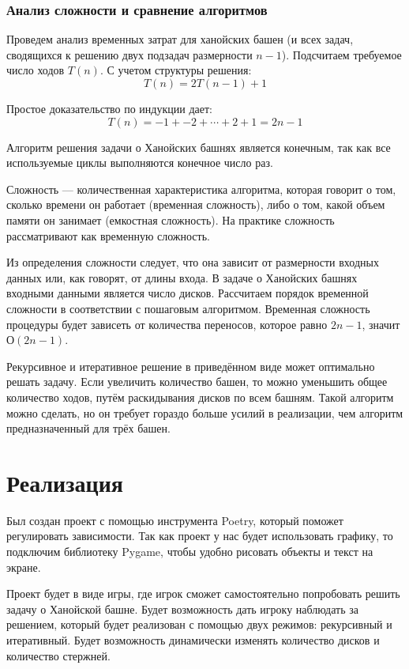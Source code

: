 \subsubsection{Анализ сложности и сравнение алгоритмов}

Проведем анализ временных затрат для ханойских башен (и всех задач, сводящихся
к решению двух подзадач размерности $n-1$). Подсчитаем требуемое число ходов
$T(n)$. С учетом структуры решения:
\[T(n) = 2T(n-1) + 1\]

Простое доказательство по индукции дает:
\[T(n) = -1 + -2 + \cdots + 2 +1 = 2n - 1\]

Алгоритм решения задачи о Ханойских башнях является конечным, так как все
используемые циклы выполняются конечное число раз.

Сложность --- количественная характеристика алгоритма, которая говорит о том,
сколько времени он работает (временная сложность), либо о том, какой объем
памяти он занимает (емкостная сложность). На практике сложность рассматривают
как временную сложность.

Из определения сложности следует, что она зависит от размерности входных данных
или, как говорят, от длины входа. В задаче о Ханойских башнях входными данными
является число дисков. Рассчитаем порядок временной сложности в соответствии с
пошаговым алгоритмом. Временная сложность процедуры будет зависеть от
количества переносов, которое равно $2n-1$, значит $О(2n-1)$.

Рекурсивное и итеративное решение в приведённом виде может оптимально решать
задачу. Если увеличить количество башен, то можно уменьшить общее количество
ходов, путём раскидывания дисков по всем башням. Такой алгоритм можно сделать,
но он требует гораздо больше усилий в реализации, чем алгоритм предназначенный
для трёх башен.

\section{Реализация}

Был создан проект с помощью инструмента Poetry\cite{Poetry}, который поможет регулировать
зависимости. Так как проект у нас будет использовать графику, то подключим
библиотеку Pygame\cite{Pygame}, чтобы удобно рисовать объекты и текст на экране.

Проект будет в виде игры, где игрок сможет самостоятельно попробовать решить
задачу о Ханойской башне. Будет возможность дать игроку наблюдать за решением,
который будет реализован с помощью двух режимов: рекурсивный и итеративный.
Будет возможность динамически изменять количество дисков и количество стержней.

